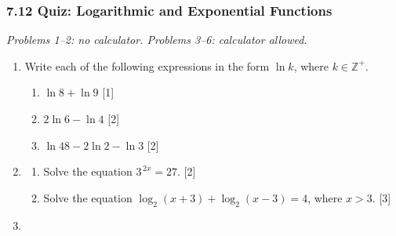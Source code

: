 \documentclass[12pt, twoside]{article}
\begin{document}
\subsubsection*{7.12 Quiz: Logarithmic and Exponential Functions}

\textit{\small Problems 1--2: no calculator. Problems 3--6: calculator
allowed.}

\begin{enumerate}[itemsep=0.15cm]

\item[1.] [Maximum mark: 5]

Write each of the following expressions in the form $\ln k$, where
$k \in \mathbb{Z}^{+}$.

\begin{enumerate}[itemsep=0.1cm]
  \item $\ln 8 + \ln 9$ \hfill [1]
  \item $2\ln 6 - \ln 4$ \hfill [2]
  \item $\ln 48 - 2\ln 2 - \ln 3$ \hfill [2]
\end{enumerate}


\newpage

\item[2.] [Maximum mark: 5]

\begin{enumerate}[itemsep=0.1cm]
  \item Solve the equation $3^{\,2x} = 27$. \hfill [2]
  \item Solve the equation
  $\log_{2}(x + 3) + \log_{2}(x - 3) = 4$, where $x > 3$. \hfill [3]
\end{enumerate}


\newpage

\item[3.] [Maximum mark: 6]


\end{enumerate}
\end{document}
